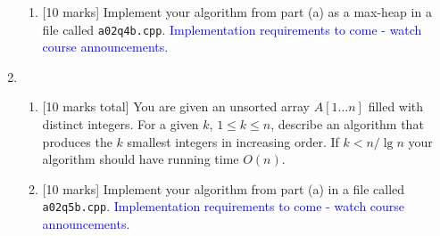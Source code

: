 \documentclass[11pt]{article}
\begin{document}
\begin{enumerate}
\begin{enumerate}
    \item {[10 marks]} Implement your algorithm from part (a) as a max-heap in a file called {\tt a02q4b.cpp}. \textcolor{blue}{Implementation requirements to come - watch course announcements.}
\end{enumerate}


\item
\begin{enumerate}
 \item {[10 marks total]}
You are given an unsorted array $A[1\ldots n]$ filled with distinct
integers. For a given $k$, $1\leq k\leq n$, describe an
algorithm that produces the $k$ smallest integers in increasing order.
If $k < n/\lg n$ your algorithm should have running time $O(n)$.
\item {[10 marks]} Implement your algorithm from part (a) in a file called {\tt a02q5b.cpp}. \textcolor{blue}{Implementation requirements to come - watch course announcements.}
\end{enumerate}
\end{enumerate}
\end{document}
